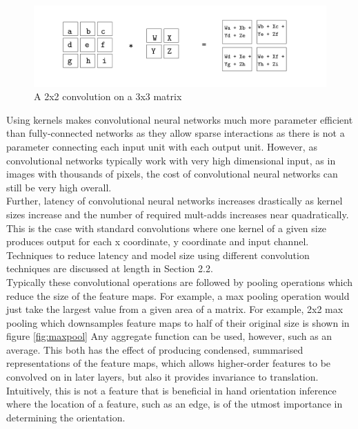 \documentclass{article}
\begin{document}
\begin{figure}
  \includegraphics[width=\linewidth]{convolutionexample.pdf}
  \caption{A 2x2 convolution on a 3x3 matrix}
  \label{fig:convolution}
\end{figure}


Using kernels makes convolutional neural networks much more parameter efficient than fully-connected networks as they allow sparse interactions as there is not a parameter connecting each input unit with each output unit. However, as convolutional networks typically work with very high dimensional input, as in images with thousands of pixels, the cost of convolutional neural networks can still be very high overall. \\

Further, latency of convolutional neural networks increases drastically as kernel sizes increase and the number of required mult-adds increases near quadratically. This is the case with standard convolutions where one kernel of a given size produces output for each x coordinate, y coordinate and input channel. Techniques to reduce latency and model size using different convolution techniques are discussed at length in Section 2.2. \\

Typically these convolutional operations are followed by pooling operations which reduce the size of the feature maps. For example, a max pooling operation would just take the largest value from a given area of a matrix. For example, 2x2 max pooling which downsamples feature maps to half of their original size is shown in figure \ref{fig:maxpool} Any aggregate function can be used, however, such as an average. This both has the effect of producing condensed, summarised representations of the feature maps, which allows higher-order features to be convolved on in later layers, but also it provides invariance to translation. Intuitively, this is not a feature that is beneficial in hand orientation inference where the location of a feature, such as an edge, is of the utmost importance in determining the orientation. \\
\end{document}

